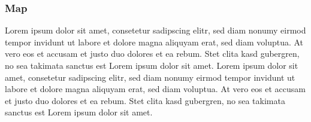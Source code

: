 \documentclass[
  twocolumn]{article}
\begin{document}
\hypertarget{map}{%
\subsubsection{Map}\label{map}}

Lorem ipsum dolor sit amet, consetetur sadipscing elitr, sed diam nonumy
eirmod tempor invidunt ut labore et dolore magna aliquyam erat, sed diam
voluptua. At vero eos et accusam et justo duo dolores et ea rebum. Stet
clita kasd gubergren, no sea takimata sanctus est Lorem ipsum dolor sit
amet. Lorem ipsum dolor sit amet, consetetur sadipscing elitr, sed diam
nonumy eirmod tempor invidunt ut labore et dolore magna aliquyam erat,
sed diam voluptua. At vero eos et accusam et justo duo dolores et ea
rebum. Stet clita kasd gubergren, no sea takimata sanctus est Lorem
ipsum dolor sit amet.
\end{document}
